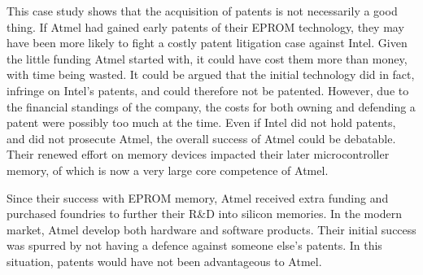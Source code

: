 This case study shows that the acquisition of patents is not necessarily a good thing.
If Atmel had gained early patents of their EPROM technology, they may have been more likely to fight a costly patent litigation case against Intel.
Given the little funding Atmel started with, it could have cost them more than money, with time being wasted. 
It could be argued that the initial technology did in fact, infringe on Intel's patents, and could therefore not be patented.
However, due to the financial standings of the company, the costs for both owning and defending a patent were possibly too much at the time.
Even if Intel did not hold patents, and did not prosecute Atmel, the overall success of Atmel could be debatable. 
Their renewed effort on memory devices impacted their later microcontroller memory, of which is now a very large core competence of Atmel.

Since their success with EPROM memory, Atmel received extra funding \cite{atmel:acq1} and purchased foundries to further their R\&D into silicon memories. 
In the modern market, Atmel develop both hardware and software products. 
Their initial success was spurred by not having a defence against someone else's patents. 
In this situation, patents would have not been advantageous to Atmel.

